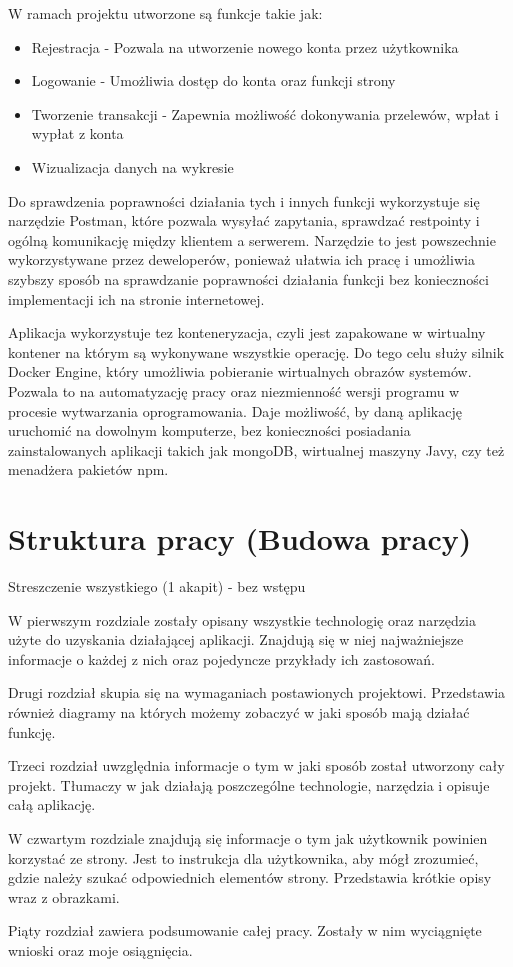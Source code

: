 W ramach projektu utworzone są funkcje takie jak:
\begin{itemize}
	\item Rejestracja - Pozwala na utworzenie nowego konta przez użytkownika
	\item Logowanie - Umożliwia dostęp do konta oraz funkcji strony
	\item Tworzenie transakcji - Zapewnia możliwość dokonywania przelewów, wpłat i wypłat z konta
	\item Wizualizacja danych na wykresie
\end{itemize}
Do sprawdzenia poprawności działania tych i innych funkcji wykorzystuje się narzędzie Postman, które pozwala wysyłać zapytania, sprawdzać restpointy i ogólną komunikację między klientem a serwerem. Narzędzie to jest powszechnie wykorzystywane przez deweloperów, ponieważ ułatwia ich pracę i umożliwia szybszy sposób na sprawdzanie poprawności działania funkcji bez konieczności implementacji ich na stronie internetowej. 

Aplikacja wykorzystuje tez konteneryzacja, czyli jest zapakowane w wirtualny kontener na którym są wykonywane wszystkie operację. Do tego celu służy silnik Docker Engine, który umożliwia pobieranie wirtualnych obrazów systemów. Pozwala to na automatyzację pracy oraz niezmienność wersji programu w procesie wytwarzania oprogramowania. Daje możliwość, by daną aplikację uruchomić na dowolnym komputerze, bez konieczności posiadania zainstalowanych aplikacji takich jak mongoDB, wirtualnej maszyny Javy, czy też menadżera pakietów npm.


\section{Struktura pracy (Budowa pracy)}
Streszczenie wszystkiego (1 akapit) - bez wstępu 

W pierwszym rozdziale zostały opisany wszystkie technologię oraz narzędzia użyte do uzyskania działającej aplikacji. Znajdują się w niej najważniejsze informacje o każdej z nich oraz pojedyncze przykłady ich zastosowań.

Drugi rozdział skupia się na wymaganiach postawionych projektowi. Przedstawia również diagramy na których możemy zobaczyć w jaki sposób mają działać funkcję.

Trzeci rozdział uwzględnia informacje o tym w jaki sposób został utworzony cały projekt. Tłumaczy w jak działają poszczególne technologie, narzędzia i opisuje całą aplikację.

W czwartym rozdziale znajdują się informacje o tym jak użytkownik powinien korzystać ze strony. Jest to instrukcja dla użytkownika, aby mógł zrozumieć, gdzie należy szukać odpowiednich elementów strony. Przedstawia krótkie opisy wraz z obrazkami. 

Piąty rozdział zawiera podsumowanie całej pracy. Zostały w nim wyciągnięte wnioski oraz moje osiągnięcia.